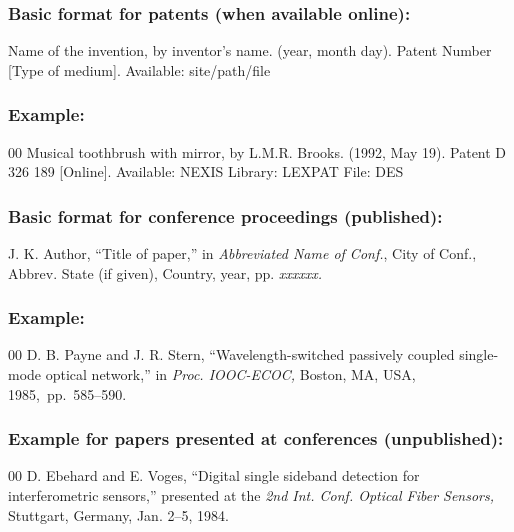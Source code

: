 \documentclass{IEEEoj}
\begin{document}
\subsubsection*{Basic format for patents (when available online):}

Name of the invention, by inventor's name. (year, month day). Patent Number [Type
of medium]. Available: {site/path/file}

\subsubsection*{Example:}

\begin{thebibliography}{00}
 Musical toothbrush with mirror, by L.M.R. Brooks. (1992, May 19). Patent D 326 189 [Online]. Available: NEXIS Library: LEXPAT File: DES
\end{thebibliography}

\subsubsection*{Basic format for conference proceedings (published):}

J. K. Author, ``Title of paper,'' in \textit{Abbreviated Name of Conf.}, City of Conf., Abbrev. State (if
given), Country, year, pp. \textit{xxxxxx.}

\subsubsection*{Example:}

\begin{thebibliography}{00}
 D. B. Payne and J. R. Stern, ``Wavelength-switched
passively coupled single-mode optical network,'' in \textit{Proc. IOOC-ECOC, }Boston, MA, USA, 1985,~pp.~585--590.
\end{thebibliography}

\subsubsection*{Example for papers presented at conferences (unpublished):}

\begin{thebibliography}{00}
 D. Ebehard and E. Voges, ``Digital single sideband
detection for interferometric sensors,'' presented at the \textit{2nd Int. Conf. Optical Fiber Sensors,} Stuttgart, Germany, Jan. 2--5, 1984.
\end{thebibliography}
\end{document}
